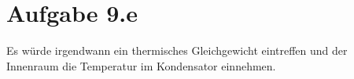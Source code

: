 \section*{Aufgabe 9.e}

Es würde irgendwann ein thermisches Gleichgewicht eintreffen und der Innenraum die Temperatur im Kondensator einnehmen.